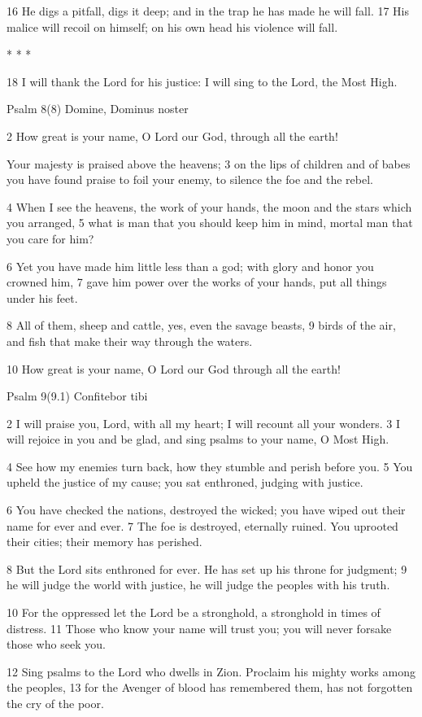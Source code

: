 16 He digs a pitfall, digs it deep;
and in the trap he has made he will fall.
17 His malice will recoil on himself;
on his own head his violence will fall.

* * *

18 I will thank the Lord for his justice:
I will sing to the Lord, the Most High.


Psalm 8(8) Domine, Dominus noster

2 How great is your name, O Lord our God,
through all the earth!

Your majesty is praised above the heavens;
3 on the lips of children and of babes
you have found praise to foil your enemy,
to silence the foe and the rebel.

4 When I see the heavens, the work of your hands,
the moon and the stars which you arranged,
5 what is man that you should keep him in mind,
mortal man that you care for him?

6 Yet you have made him little less than a god;
with glory and honor you crowned him,
7 gave him power over the works of your hands,
put all things under his feet.

8 All of them, sheep and cattle,
yes, even the savage beasts,
9 birds of the air, and fish
that make their way through the waters.

10 How great is your name, O Lord our God
through all the earth!


Psalm 9(9.1) Confitebor tibi

2 I will praise you, Lord, with all my heart;
I will recount all your wonders.
3 I will rejoice in you and be glad,
and sing psalms to your name, O Most High.

4 See how my enemies turn back,
how they stumble and perish before you.
5 You upheld the justice of my cause;
you sat enthroned, judging with justice.

6 You have checked the nations, destroyed the wicked;
you have wiped out their name for ever and ever.
7 The foe is destroyed, eternally ruined.
You uprooted their cities; their memory has perished.

8 But the Lord sits enthroned for ever.
He has set up his throne for judgment;
9 he will judge the world with justice,
he will judge the peoples with his truth.

10 For the oppressed let the Lord be a stronghold,
a stronghold in times of distress.
11 Those who know your name will trust you;
you will never forsake those who seek you.

12 Sing psalms to the Lord who dwells in Zion.
Proclaim his mighty works among the peoples,
13 for the Avenger of blood has remembered them,
has not forgotten the cry of the poor.

